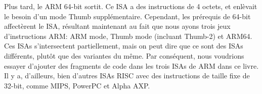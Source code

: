 Plus tard, le ARM 64-bit sortit. Ce \ac{ISA} a des instructions de 4 octets, et enlèvait le besoin d'un mode Thumb supplémentaire.
Cependant, les prérequis de 64-bit affectèrent le \ac{ISA}, résultant maintenant au fait que nous ayons trois jeux d'instructions ARM: ARM mode, Thumb mode (incluant Thumb-2) et ARM64.
Ces \ac{ISA}s s'intersectent partiellement, mais on peut dire que ce sont des \ac{ISA}s différents, plutôt que des variantes du même.
Par conséquent, nous voudrions essayer d'ajouter des fragments de code dans les trois \ac{ISA}s de ARM dans ce livre.
%
%
%
Il y a, d'ailleurs, bien d'autres \ac{ISA}s \ac{RISC} avec des instructions de taille fixe de 32-bit, comme MIPS, PowerPC et Alpha AXP.
